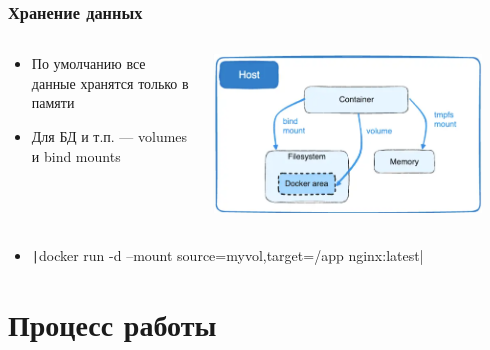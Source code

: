 \documentclass{../../slides-style}
\begin{document}
    \begin{frame}
        \frametitle{Хранение данных}
        \begin{columns}
            \begin{column}{0.5\textwidth}
                \begin{itemize}
                    \item По умолчанию все данные хранятся только в памяти
                    \item Для БД и т.п. --- volumes и bind mounts
                \end{itemize}
            \end{column}
            \begin{column}{0.5\textwidth}
                \includegraphics[width=0.9\textwidth]{persistence.png}
            \end{column}
        \end{columns}
        \begin{itemize}
            \item \texttt|docker run -d --mount source=myvol,target=/app nginx:latest|
        \end{itemize}
    \end{frame}

    \section{Процесс работы}
\end{document}
